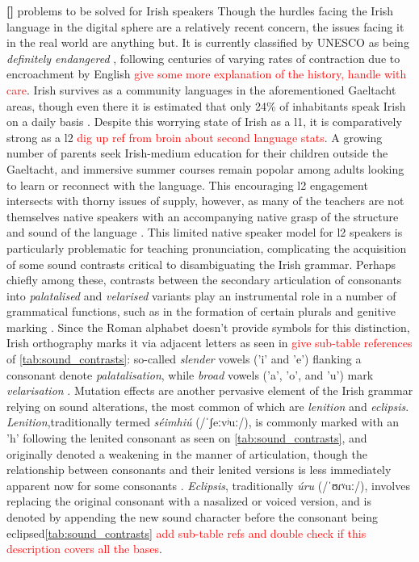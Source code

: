 \documentclass[thesis]{cluu}
\newcounter{paranum}
\newcommand{\numberedparagraph}{\par\refstepcounter{paranum}\textbf{[\theparanum] }}
\newcommand{\todo}[1]{\textcolor{red}{#1}}
\newcommand{\ipa}[1]{{\ipafont #1}}
\begin{document}
\numberedparagraph problems to be solved for Irish speakers 
Though the hurdles facing the Irish language in the digital sphere are a relatively recent concern, the issues facing it in the real world are anything but. It is currently classified by UNESCO as being \textit{definitely endangered} \parencite{moseleyAtlasWorldsLanguages2010}, following centuries of varying rates of contraction due to encroachment by English \todo{give some more explanation of the history, handle with care}. Irish survives as a community languages in the aforementioned Gaeltacht areas, though even there it is estimated that only 24\% of inhabitants speak Irish on a daily basis \parencite{nichasaideSPEECHTECHNOLOGYDOCUMENTATION}. Despite this worrying state of Irish as a \gls{l1}, it is comparatively strong as a \gls{l2} \todo{dig up ref from broin about second language stats}. A growing number of parents seek Irish-medium education for their children outside the Gaeltacht, and immersive summer courses remain popolar among adults looking to learn or reconnect with the language. This encouraging \gls{l2} engagement intersects with thorny issues of supply, however, as many of the teachers are not themselves native speakers with an accompanying native grasp of the structure and sound of the language \parencite{nichasaideSPEECHTECHNOLOGYDOCUMENTATION,nichasaideCanWeDefuse2019}. This limited native speaker model for \gls{l2} speakers is particularly problematic for teaching pronunciation, complicating the acquisition of some sound contrasts critical to disambiguating the Irish grammar. Perhaps chiefly among these, contrasts between the secondary articulation of consonants into \textit{palatalised} and \textit{velarised} variants play an instrumental role in a number of grammatical functions, such as in the formation of certain plurals and genitive marking \parencite{snesarevaPalatalizationDublinIrish2016,gabrieleEnglishInfluenceL2,broinNewUrbanIrish,stensonModernIrishComprehensive2020}. Since the Roman alphabet doesn't provide symbols for this distinction, Irish orthography marks it via adjacent letters as seen in \todo{give sub-table references} of \cref{tab:sound_contrasts}: so-called \textit{slender} vowels ('i' and 'e') flanking a consonant denote \textit{palatalisation}, while \textit{broad} vowels ('a', 'o', and 'u') mark \textit{velarisation} \parencite{stensonModernIrishComprehensive2020}. Mutation effects are another pervasive element of the Irish grammar relying on sound alterations, the most common of which are \textit{lenition} and \textit{eclipsis}. \textit{Lenition},traditionally termed \textit{séimhiú} (/\ipa{ˈʃeːvʲuː}/), is commonly marked with an 'h' following the lenited consonant as seen on \cref{tab:sound_contrasts}, and originally denoted a weakening in the manner of articulation, though the relationship between consonants and their lenited versions is less immediately apparent now for some consonants \parencite{stensonModernIrishComprehensive2020}. \textit{Eclipsis}, traditionally \textit{úru} (/\ipa{ˈʊɾˠuː}/), involves replacing the original consonant with a nasalized or voiced version, and is denoted by appending the new sound character before the consonant being eclipsed\ref{tab:sound_contrasts} \todo{add sub-table refs and double check if this description covers all the bases}. 
\end{document}
